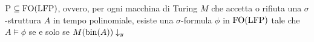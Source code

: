 \begin{corollario}
\label{cor:P-subset-FO(LFP)}
 $\operatorname{P} \subseteq \operatorname{FO}(\operatorname{LFP})$, ovvero, per ogni macchina di Turing $M$ che accetta o
 rifiuta una $\sigma$-struttura $A$ in tempo polinomiale, esiste una
 $\sigma$-formula $\phi$ in $\operatorname{FO}(\operatorname{LFP})$ tale che
 $A \models \phi$ se e solo se $M(\operatorname{bin}(A))\downarrow_y$
\end{corollario}



